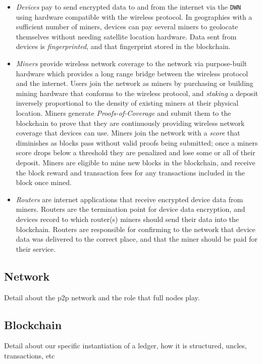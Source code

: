 \documentclass[letterpaper,11pt]{report}
\begin{document}
\begin{itemize}
	\item \textit{Devices} pay to send encrypted data to and from the internet via the \verb|DWN| using hardware compatible with the wireless protocol. In geographies with a sufficient number of miners, devices can pay several miners to geolocate themselves without needing satellite location hardware. Data sent from devices is \textit{fingerprinted}, and that fingerprint stored in the blockchain. 
	\item \textit{Miners} provide wireless network coverage to the network via purpose-built hardware which provides a long range bridge between the wireless protocol and the internet. Users join the network as miners by purchasing or building mining hardware that conforms to the wireless protocol, and \textit{staking} a deposit inversely proportional to the density of existing miners at their physical location. Miners generate \textit{Proofs-of-Coverage} and submit them to the blockchain to prove that they are continuously providing wireless network coverage that devices can use. Miners join the network with a \textit{score} that diminishes as blocks pass without valid proofs being submitted; once a miners score drops below a threshold they are penalized and lose some or all of their deposit. Miners are eligible to mine new blocks in the blockchain, and receive the block reward and transaction fees for any transactions included in the block once mined.
	\item \textit{Routers} are internet applications that receive encrypted device data from miners. Routers are the termination point for device data encryption, and devices record to which router(s) miners should send their data into the blockchain. Routers are responsible for confirming to the network that device data was delivered to the correct place, and that the miner should be paid for their service.
\end{itemize}

\subsection{Network}

Detail about the p2p network and the role that full nodes play.

\subsection{Blockchain}

Detail about our specific instantiation of a ledger, how it is structured, uncles, transactions, etc
\end{document}
